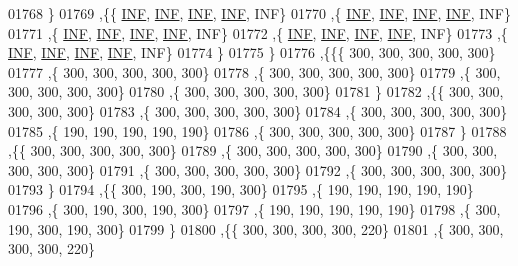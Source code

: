 \begin{DoxyCode}
01768    \}
01769   ,\{\{   \hyperlink{constants_8h_a12c2040f25d8e3a7b9e1c2024c618cb6}{INF},   \hyperlink{constants_8h_a12c2040f25d8e3a7b9e1c2024c618cb6}{INF},   \hyperlink{constants_8h_a12c2040f25d8e3a7b9e1c2024c618cb6}{INF},   \hyperlink{constants_8h_a12c2040f25d8e3a7b9e1c2024c618cb6}{INF},   INF\}
01770    ,\{   \hyperlink{constants_8h_a12c2040f25d8e3a7b9e1c2024c618cb6}{INF},   \hyperlink{constants_8h_a12c2040f25d8e3a7b9e1c2024c618cb6}{INF},   \hyperlink{constants_8h_a12c2040f25d8e3a7b9e1c2024c618cb6}{INF},   \hyperlink{constants_8h_a12c2040f25d8e3a7b9e1c2024c618cb6}{INF},   INF\}
01771    ,\{   \hyperlink{constants_8h_a12c2040f25d8e3a7b9e1c2024c618cb6}{INF},   \hyperlink{constants_8h_a12c2040f25d8e3a7b9e1c2024c618cb6}{INF},   \hyperlink{constants_8h_a12c2040f25d8e3a7b9e1c2024c618cb6}{INF},   \hyperlink{constants_8h_a12c2040f25d8e3a7b9e1c2024c618cb6}{INF},   INF\}
01772    ,\{   \hyperlink{constants_8h_a12c2040f25d8e3a7b9e1c2024c618cb6}{INF},   \hyperlink{constants_8h_a12c2040f25d8e3a7b9e1c2024c618cb6}{INF},   \hyperlink{constants_8h_a12c2040f25d8e3a7b9e1c2024c618cb6}{INF},   \hyperlink{constants_8h_a12c2040f25d8e3a7b9e1c2024c618cb6}{INF},   INF\}
01773    ,\{   \hyperlink{constants_8h_a12c2040f25d8e3a7b9e1c2024c618cb6}{INF},   \hyperlink{constants_8h_a12c2040f25d8e3a7b9e1c2024c618cb6}{INF},   \hyperlink{constants_8h_a12c2040f25d8e3a7b9e1c2024c618cb6}{INF},   \hyperlink{constants_8h_a12c2040f25d8e3a7b9e1c2024c618cb6}{INF},   INF\}
01774    \}
01775   \}
01776  ,\{\{\{   300,   300,   300,   300,   300\}
01777    ,\{   300,   300,   300,   300,   300\}
01778    ,\{   300,   300,   300,   300,   300\}
01779    ,\{   300,   300,   300,   300,   300\}
01780    ,\{   300,   300,   300,   300,   300\}
01781    \}
01782   ,\{\{   300,   300,   300,   300,   300\}
01783    ,\{   300,   300,   300,   300,   300\}
01784    ,\{   300,   300,   300,   300,   300\}
01785    ,\{   190,   190,   190,   190,   190\}
01786    ,\{   300,   300,   300,   300,   300\}
01787    \}
01788   ,\{\{   300,   300,   300,   300,   300\}
01789    ,\{   300,   300,   300,   300,   300\}
01790    ,\{   300,   300,   300,   300,   300\}
01791    ,\{   300,   300,   300,   300,   300\}
01792    ,\{   300,   300,   300,   300,   300\}
01793    \}
01794   ,\{\{   300,   190,   300,   190,   300\}
01795    ,\{   190,   190,   190,   190,   190\}
01796    ,\{   300,   190,   300,   190,   300\}
01797    ,\{   190,   190,   190,   190,   190\}
01798    ,\{   300,   190,   300,   190,   300\}
01799    \}
01800   ,\{\{   300,   300,   300,   300,   220\}
01801    ,\{   300,   300,   300,   300,   220\}

\end{DoxyCode}
